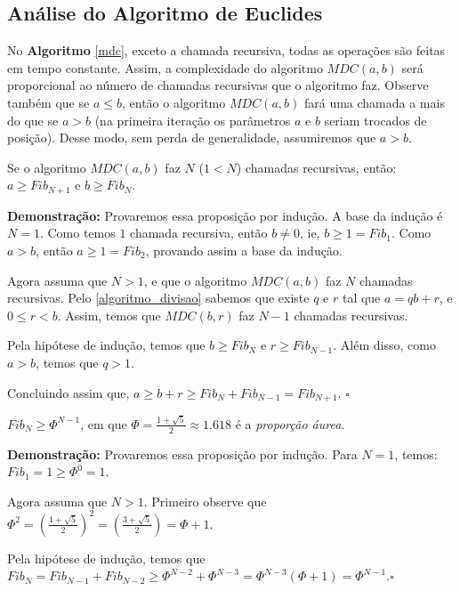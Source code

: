 \subsection{Análise do Algoritmo de Euclides}

No \textbf{Algoritmo} \autoref{mdc}, exceto a chamada recursiva, todas as operações são feitas em tempo constante. Assim, 
a complexidade do algoritmo $MDC(a,b)$ será proporcional ao número de chamadas recursivas que o algoritmo faz.
Observe também que se $a\leq b$, então o algoritmo $MDC(a,b)$ fará uma chamada a mais do que se $a>b$ (na primeira iteração
os parâmetros $a$ e $b$ seriam trocados de posição). Desse modo, sem perda de generalidade, assumiremos que $a > b$.

\begin{proposition}\label{algoritmo_euclides_prop1}
Se o algoritmo $MDC(a,b)$ faz $N$ ($1 < N$) chamadas recursivas, então: $a\geq Fib_{N+1}$ e $b \geq Fib_{N}$.
\end{proposition}
\textbf{Demonstração:}
Provaremos essa proposição por indução. A base da indução é $N=1$. Como temos $1$ chamada recursiva, então $b\neq0$, ie, 
$b \geq 1 = Fib_1$. Como $a > b$, então $a \geq 1 = Fib_2$, provando assim a base da indução.  

Agora assuma que $N>1$, e que o algoritmo $MDC(a,b)$ faz $N$ chamadas recursivas. Pelo \autoref{algoritmo_divisao} sabemos que existe
$q$ e $r$ tal que $a=qb+r$, e $0\leq r<b$. 
Assim, temos que $MDC(b,r)$ faz $N-1$ chamadas recursivas.

Pela hipótese de indução, temos que $b\geq Fib_N$ e $r\geq Fib_{N-1}$. Além disso, como $a > b$, temos que $q > 1$. 

Concluindo assim que, $a \geq b+r \geq Fib_N + Fib_{N-1} = Fib_{N+1}$. $\square$

\begin{proposition}\label{algoritmo_euclides_prop2}
$Fib_N \geq \Phi^{N-1}$, em que $\Phi = \frac{1+\sqrt{5}}{2} \approx 1.618$ é a \textit{proporção áurea}.
\end{proposition}
\textbf{Demonstração:}
Provaremos essa proposição por indução. Para $N=1$, temos: $Fib_1 = 1 \geq \Phi^{0} = 1$.

Agora assuma que $N>1$. Primeiro observe que $\Phi^2 = (\frac{1+\sqrt{5}}{2})^2 = (\frac{3+\sqrt{5}}{2}) = \Phi + 1$.

Pela hipótese de indução, temos que $Fib_N = Fib_{N-1} + Fib_{N-2} \geq \Phi^{N-2} + \Phi^{N-3} = \Phi^{N-3}(\Phi+1) = \Phi^{N-1}$.$\square$
\newline

